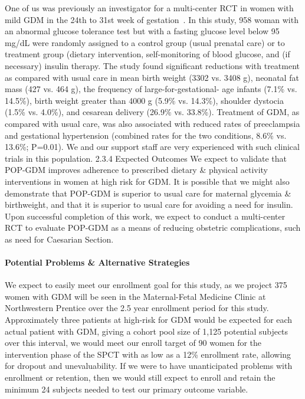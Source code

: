 One of us was previously an investigator for a multi-center RCT in
women with mild GDM in the 24th to 31st week of
gestation~\cite{LandonPeaceman2009}. In this study, 958 woman with an
abnormal glucose tolerance test but with a fasting glucose level below
95 mg/dL were randomly assigned to a control group (usual prenatal
care) or to treatment group (dietary intervention, self-monitoring of
blood glucose, and (if necessary) insulin therapy. The study found
significant reductions with treatment as compared with usual care in
mean birth weight (3302 vs. 3408 g), neonatal fat mass (427 vs. 464
g), the frequency of large-for-gestational- age infants (7.1\%
vs. 14.5\%), birth weight greater than 4000 g (5.9\% vs. 14.3\%),
shoulder dystocia (1.5\% vs. 4.0\%), and cesarean delivery (26.9\%
vs. 33.8\%). Treatment of GDM, as compared with usual care, was also
associated with reduced rates of preeclampsia and gestational
hypertension (combined rates for the two conditions, 8.6\% vs. 13.6\%;
P=0.01). We and our support staff are very experienced with such
clinical trials in this population.  2.3.4 Expected Outcomes We expect
to validate that POP-GDM improves adherence to prescribed dietary \&
physical activity interventions in women at high risk for GDM. It is
possible that we might also demonstrate that POP-GDM is superior to
usual care for maternal glycemia \& birthweight, and that it is
superior to usual care for avoiding a need for insulin. Upon
successful completion of this work, we expect to conduct a
multi-center RCT to evaluate POP-GDM as a means of reducing obstetric
complications, such as need for Caesarian Section.
 

\paragraph{Potential Problems \& Alternative Strategies}
We expect to easily meet our enrollment goal for this study, as we
project 375 women with GDM will be seen in the Maternal-Fetal Medicine
Clinic at Northwestern Prentice over the 2.5 year enrollment period
for this study. Approximately three patients at high-risk for GDM
would be expected for each actual patient with GDM, giving a cohort
pool size of 1,125 potential subjects over this interval, we would
meet our enroll target of 90 women for the intervention phase of the SPCT with as low as a
12\% enrollment rate, allowing for dropout and unevaluability. If we
were to have unanticipated problems with enrollment or retention, then
we would still expect to enroll and retain the minimum 24 subjects
needed to test our primary outcome variable.

